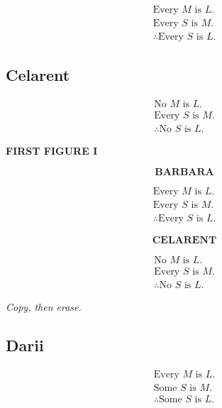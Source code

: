 \documentclass[11pt]{article}
\begin{document}
\[
\begin{array}{l}
\text{Every }M\text{ is }L.\\
\text{Every }S\text{ is }M.\\
\hline
\therefore\text{Every }S\text{ is }L.
\end{array}
\]

\subsection{Celarent}

\[
\begin{array}{l}
\text{No }M\text{ is }L.\\
\text{Every }S\text{ is }M.\\
\hline
\therefore\text{No }S\text{ is }L.
\end{array}
\]

\begin{whiteboard}
\textbf{FIRST FIGURE I}

\[
\textbf{BARBARA}
\]

\[
\begin{array}{l}
\text{Every }M\text{ is }L.\\
\text{Every }S\text{ is }M.\\
\hline
\therefore\text{Every }S\text{ is }L.
\end{array}
\]

\vspace{0.5em}

\[
\textbf{CELARENT}
\]

\[
\begin{array}{l}
\text{No }M\text{ is }L.\\
\text{Every }S\text{ is }M.\\
\hline
\therefore\text{No }S\text{ is }L.
\end{array}
\]

\textit{Copy, then erase.}
\end{whiteboard}

\subsection{Darii}

\[
\begin{array}{l}
\text{Every }M\text{ is }L.\\
\text{Some }S\text{ is }M.\\
\hline
\therefore\text{Some }S\text{ is }L.
\end{array}
\]
\end{document}
